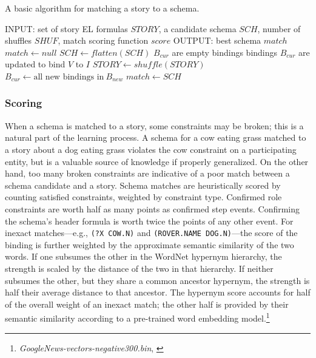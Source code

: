 \begin{algorithm}
\caption{A basic algorithm for matching a story to a schema.}
\label{alg:matching}
\begin{algorithmic}
\STATE INPUT: set of story EL formulas $STORY$, a candidate schema $SCH$, number of shuffles $SHUF$, match scoring function $score$
\STATE OUTPUT: best schema $match$
\STATE $match \gets null$
\STATE $SCH \gets flatten(SCH)$
\STATE $B_{cur}$ are empty bindings
            \STATE bindings $B_{cur}$ are updated to bind $V$ to $I$
        \ENDIF
    \ENDFOR
\ENDFOR
{}
    \STATE $STORY \gets shuffle(STORY)$
                \STATE $B_{cur} \gets \text{all new bindings in} \  B_{new}$
            \ENDIF
        \ENDFOR
    \ENDFOR
        \STATE $match \gets SCH$
    \ENDIF
\ENDFOR
\end{algorithmic}
\end{algorithm}

\subsubsection{Scoring}
When a schema is matched to a story, some constraints may be broken; this is a natural part of the learning process. A schema for a cow eating grass matched to a story about a dog eating grass violates the cow constraint on a participating entity, but is a valuable source of knowledge if properly generalized. On the other hand, too many broken constraints are indicative of a poor match between a schema candidate and a story.
Schema matches are heuristically scored by counting satisfied constraints, weighted by constraint type.
Confirmed role constraints are worth half as many points as confirmed step events.
Confirming the schema's header formula is worth twice the points of any other event.
For inexact matches---e.g., \texttt{(?X COW.N)} and \texttt{(ROVER.NAME DOG.N)}---the score of the binding is further weighted by the approximate semantic similarity of the two words. If one subsumes the other in the WordNet hypernym hierarchy, the strength is scaled by the distance of the two in that hierarchy. If neither subsumes the other, but they share a common ancestor hypernym, the strength is half their average distance to that ancestor.
The hypernym score accounts for half of the overall weight of an inexact match; the other half is provided by their semantic similarity according to a pre-trained word embedding model.\footnote{\textit{GoogleNews-vectors-negative300.bin}, \citet{NIPS2013_5021}}

